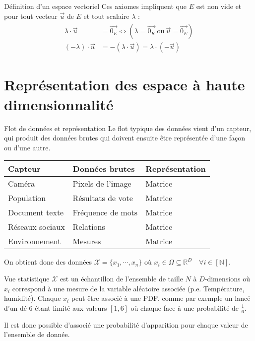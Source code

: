 \documentclass[a4paper]{article}
\begin{document}
\begin{parag}{Définition d'un espace vectoriel}
		Ces axiomes impliquent que $E$ est non vide et pour tout vecteur $\vec{u}$ de $E$ et tout scalaire $\lambda$ :
		\begin{align}
		\begin{split}
			\lambda \cdot \vec{u} &= \vec{0_E} \Leftrightarrow (\lambda = \vec{0_K}\ \text{ou}\ \vec{u} = \vec{0_E}) \\
			(-\lambda) \cdot \vec{u} &= -(\lambda \cdot \vec{u}) = \lambda \cdot (-\vec{u})
		\end{split}
		\end{align}
	\end{parag}

	\section{Représentation des espace à haute dimensionnalité}
	\begin{parag}{Flot de données et représentation}
		Le flot typique des données vient d'un capteur, qui produit des données brutes qui doivent ensuite être représentée d'une façon ou d'une autre.

		
		\begin{center}
		\begin{tabular}{ | l | l | l | }
			\hline
			\textbf{Capteur} & \textbf{Données brutes} & \textbf{Représentation} \\
			\hline \hline
			Caméra & Pixels de l'image & Matrice \\
			Population & Résultats de vote & Matrice \\
			Document texte & Fréquence de mots & Matrice \\
			Réseaux sociaux & Relations & Matrice \\
			Environnement & Mesures & Matrice \\
			\hline
		\end{tabular}
		\end{center}

		On obtient donc des données $\mathcal{X} = \{x_1, \cdots, x_n\}$ où $x_i \in \Omega \subseteq \mathbb{R}^D \quad \forall i \in [\mathbb{N}]$.
	\end{parag}

	\begin{parag}{Vue statistique}
		$\mathcal{X}$ est un échantillon de l'ensemble de taille $N$ à $D$-dimensions où $x_i$ correspond à une mesure de la variable aléatoire associée (p.e. Température, humidité). Chaque $x_i$ peut être associé à une PDF, comme par exemple un lancé d'un dé-6 étant limité aux valeurs $[1, 6]$ où chaque face à une probabilité de $\frac{1}{6}$.

		Il est donc possible d'associé une probabilité d'apparition pour chaque valeur de l'ensemble de donnée.
	\end{parag}
\end{document}
